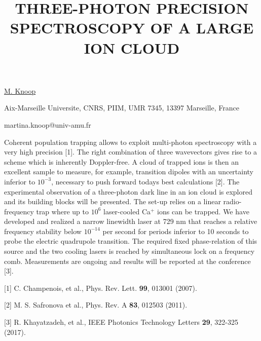 \title{THREE-PHOTON PRECISION SPECTROSCOPY OF A LARGE ION CLOUD}

\underline{M. Knoop} 

{\normalsize{\vspace{-4mm}
Aix-Marseille Universite, CNRS, PIIM, UMR 7345, 13397 Marseille, France

\email martina.knoop@univ-amu.fr}}

Coherent population trapping allows to exploit multi-photon spectroscopy with a very high precision [1]. The right combination of three wavevectors gives rise to a scheme which is inherently Doppler-free. A cloud of trapped ions is then an excellent sample to measure, for example, transition dipoles with an uncertainty inferior to $10^{-3}$, necessary to push forward todays best calculations [2].
The experimental observation of a three-photon dark line in an ion cloud is explored and its building blocks will be presented. The set-up relies on a linear radio-frequency trap where up to $10^6$ laser-cooled Ca$^+$ ions can be trapped. We have developed and realized a narrow linewidth laser at 729 nm that reaches a relative frequency stability below $10^{-14}$ per second for periods inferior to 10 seconds to probe the electric quadrupole transition. The required fixed phase-relation of this source and the two cooling lasers is reached by simultaneous lock on a frequency comb. Measurements are ongoing and results will be reported at the conference [3].

{\normalsize
[1] C. Champenois, et al., Phys. Rev. Lett. \textbf{99}, 013001 (2007).
\vsp

[2] M. S. Safronova et al., Phys. Rev. A \textbf{83}, 012503 (2011).
\vsp

[3] R. Khayatzadeh, et al., IEEE Photonics Technology Letters \textbf{29}, 322-325 (2017).
}

\vspace{\baselineskip} 